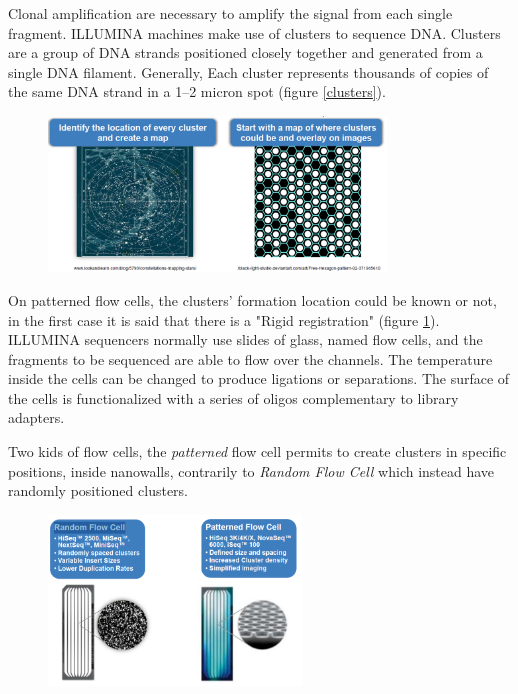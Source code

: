 Clonal amplification are necessary to amplify the signal from each single fragment.
ILLUMINA machines make use of clusters to sequence DNA. Clusters are a group of DNA
strands positioned closely together and generated from a single DNA filament. Generally, Each cluster represents thousands of copies of the same DNA strand in a 1–2 micron spot (figure \ref{clusters}).

\begin{figure}[h]
\caption{}
\centering
\includegraphics[width=0.8\textwidth]{rigidGeneration}
\label{rigid}
\end{figure}

On patterned flow cells, the clusters' formation location could be known or not, in the first case it is said that there is a "Rigid registration" (figure \ref{rigid}).\\


ILLUMINA sequencers normally use slides of glass, named flow cells, and the fragments to be sequenced are able to flow over the channels. The temperature inside the cells can be changed to produce ligations or separations. The surface of the cells is functionalized with a series of oligos complementary to library adapters.

Two kids of flow cells, the \textit{patterned} flow cell permits to create clusters in specific positions, inside nanowalls, contrarily to \textit{Random Flow Cell} which instead have randomly positioned clusters.
\begin{figure}[h]
\caption{}
\centering
\includegraphics[width=0.6\textwidth]{randomPatternCells}
\label{}
\end{figure}
\\

